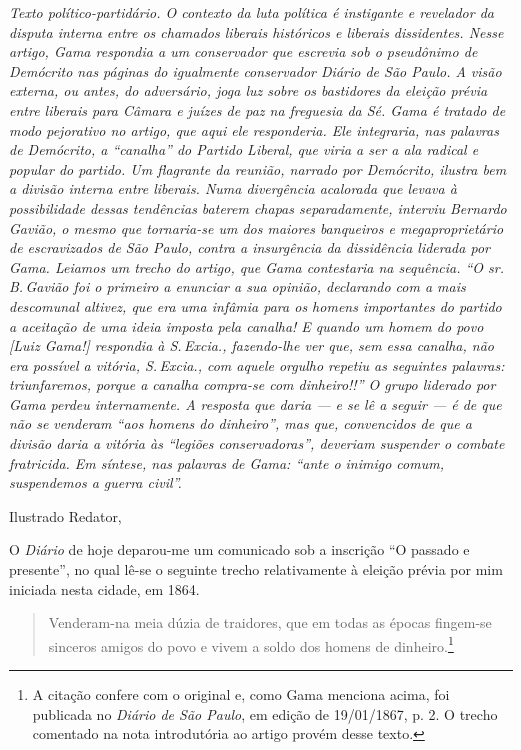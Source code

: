 \begin{didascalia}\itshape
Texto político-partidário. O contexto da luta política é instigante e
revelador da disputa interna entre os chamados liberais históricos e
liberais dissidentes. Nesse artigo, Gama respondia a um conservador que
escrevia sob o pseudônimo de Demócrito nas páginas do igualmente
conservador \textnormal{Diário de São Paulo}. A visão externa, ou antes, do
adversário, joga luz sobre os bastidores da eleição prévia entre
liberais para Câmara e juízes de paz na freguesia da Sé. Gama é tratado
de modo pejorativo no artigo, que aqui ele responderia. Ele
integraria, nas palavras de Demócrito, a ``canalha'' do Partido
Liberal, que viria a ser a ala radical e popular do partido. Um
flagrante da reunião, narrado por Demócrito, ilustra bem a divisão
interna entre liberais. Numa divergência acalorada que levava à
possibilidade dessas tendências baterem chapas separadamente, interviu
Bernardo Gavião, o mesmo que tornaria-se um dos maiores banqueiros e
megaproprietário de escravizados de São Paulo, contra a insurgência da
dissidência liderada por Gama. Leiamos um trecho do artigo, que Gama
contestaria na sequência. ``O sr.\,B.\,Gavião foi o primeiro a enunciar a
sua opinião, declarando com a mais descomunal altivez, \textnormal{que era uma
infâmia para os homens importantes do partido a aceitação de uma ideia
imposta pela canalha!} E quando um homem do povo {[}Luiz Gama!{]}
respondia à S.\,Excia., fazendo-lhe ver que, sem \textnormal{essa canalha}, não
era possível a vitória, S.\,Excia., com aquele orgulho repetiu as
seguintes palavras: triunfaremos, porque a canalha compra-se com
dinheiro!!'' O grupo liderado por Gama perdeu internamente. A resposta
que daria --- e se lê a seguir --- é de que não se venderam ``aos homens do
dinheiro'', mas que, convencidos de que a divisão daria a vitória às
``legiões conservadoras'', deveriam suspender o combate fratricida. Em
síntese, nas palavras de Gama: ``ante o inimigo comum, suspendemos a
guerra civil''.
\end{didascalia}



Ilustrado Redator,

O \emph{Diário} de hoje deparou-me um comunicado sob a inscrição ``O
passado e presente'', no qual lê-se o seguinte trecho relativamente à
eleição prévia por mim iniciada nesta cidade, em 1864.


\begin{quote}
Venderam-na meia dúzia de traidores, que em todas as épocas fingem-se
sinceros amigos do povo e vivem a soldo dos homens de
dinheiro.\footnote{A citação confere com o original e, como Gama
  menciona acima, foi publicada no \emph{Diário de São Paulo}, em edição
  de 19/01/1867, p. 2. O trecho comentado na nota introdutória ao artigo
  provém desse texto.}
\end{quote}

